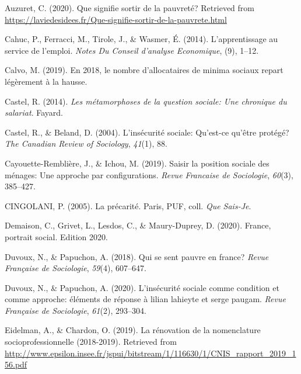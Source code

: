 \documentclass[12pt,a4paper]{reedthesis}
\newenvironment{CSLReferences}%
  {}%
  {\par}
\begin{document}
\hypertarget{refs}{}
\begin{CSLReferences}{1}{0}
\leavevmode\hypertarget{ref-auzuret2020signifie}{}%
Auzuret, C. (2020). Que signifie sortir de la pauvret{é}? Retrieved from \url{https://laviedesidees.fr/Que-signifie-sortir-de-la-pauvrete.html}

\leavevmode\hypertarget{ref-cahuc2014apprentissage}{}%
Cahuc, P., Ferracci, M., Tirole, J., \& Wasmer, É. (2014). L'apprentissage au service de l'emploi. \emph{Notes Du Conseil d'analyse Economique}, (9), 1--12.

\leavevmode\hypertarget{ref-calvo20192018}{}%
Calvo, M. (2019). En 2018, le nombre d'allocataires de minima sociaux repart l{é}g{è}rement {à} la hausse.

\leavevmode\hypertarget{ref-castel2014metamorphoses}{}%
Castel, R. (2014). \emph{Les m{é}tamorphoses de la question sociale: Une chronique du salariat}. Fayard.

\leavevmode\hypertarget{ref-castel2004insecurite}{}%
Castel, R., \& Beland, D. (2004). L'ins{é}curit{é} sociale: Qu'est-ce qu'{ê}tre prot{é}g{é}? \emph{The Canadian Review of Sociology}, \emph{41}(1), 88.

\leavevmode\hypertarget{ref-cayouette2019saisir}{}%
Cayouette-Remblière, J., \& Ichou, M. (2019). Saisir la position sociale des m{é}nages: Une approche par configurations. \emph{Revue Francaise de Sociologie}, \emph{60}(3), 385--427.

\leavevmode\hypertarget{ref-cingolani2005precarite}{}%
CINGOLANI, P. (2005). La pr{é}carit{é}. Paris, PUF, coll.{{}} \emph{Que Sais-Je}.

\leavevmode\hypertarget{ref-demaison2020france}{}%
Demaison, C., Grivet, L., Lesdos, C., \& Maury-Duprey, D. (2020). France, portrait social. Edition 2020.

\leavevmode\hypertarget{ref-duvoux2018qui}{}%
Duvoux, N., \& Papuchon, A. (2018). Qui se sent pauvre en france? \emph{Revue Fran{ç}aise de Sociologie}, \emph{59}(4), 607--647.

\leavevmode\hypertarget{ref-duvoux2020insecurite}{}%
Duvoux, N., \& Papuchon, A. (2020). L'ins{é}curit{é} sociale comme condition et comme approche: {é}l{é}ments de r{é}ponse {à} lilian lahieyte et serge paugam. \emph{Revue Fran{ç}aise de Sociologie}, \emph{61}(2), 293--304.

\leavevmode\hypertarget{ref-eidelman2019renovation}{}%
Eidelman, A., \& Chardon, O. (2019). La r{é}novation de la nomenclature socioprofessionnelle (2018-2019). Retrieved from \url{http://www.epsilon.insee.fr/jspui/bitstream/1/116630/1/CNIS_rapport_2019_156.pdf}


\end{CSLReferences}
\end{document}
